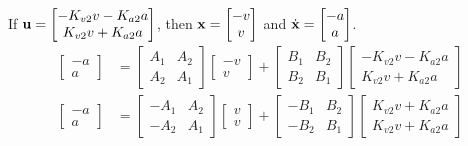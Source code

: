 If $\mathbf{u} =
\begin{bmatrix}
  -K_{v2} v - K_{a2} a \\
  K_{v2} v + K_{a2} a
\end{bmatrix}$, then $\mathbf{x} =
\begin{bmatrix}
  -v \\
  v
\end{bmatrix}$ and $\dot{\mathbf{x}} =
\begin{bmatrix}
  -a \\
  a
\end{bmatrix}$.
\begin{align*}
  \begin{bmatrix}
    -a \\
    a
  \end{bmatrix} &=
    \begin{bmatrix}
      A_1 & A_2 \\
      A_2 & A_1
    \end{bmatrix}
    \begin{bmatrix}
      -v \\
      v
    \end{bmatrix} +
    \begin{bmatrix}
      B_1 & B_2 \\
      B_2 & B_1
    \end{bmatrix}
    \begin{bmatrix}
      -K_{v2} v - K_{a2} a \\
      K_{v2} v + K_{a2} a
    \end{bmatrix} \\
  \begin{bmatrix}
    -a \\
    a
  \end{bmatrix} &=
    \begin{bmatrix}
      -A_1 & A_2 \\
      -A_2 & A_1
    \end{bmatrix}
    \begin{bmatrix}
      v \\
      v
    \end{bmatrix} +
    \begin{bmatrix}
      -B_1 & B_2 \\
      -B_2 & B_1
    \end{bmatrix}
    \begin{bmatrix}
      K_{v2} v + K_{a2} a \\
      K_{v2} v + K_{a2} a
    \end{bmatrix} \\

\end{align*}
